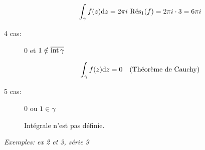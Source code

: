 \begin{example}[1]
\begin{description}
    \[ \int_\gamma f(z) \dz = 2\pi i \ \Res_{1}(f) = 2\pi i \cdot 3 = 6 \pi i \]
    
    \item[4\ieme{} cas:] 0 et $1 \notin \overline{\textrm{int}\, \gamma}$
    
    \[ \int_\gamma f(z) \mathrm{d}z = 0 \quad \textrm{(Théorème de Cauchy)} \]
    
    \item[5\ieme{} cas:] 0 ou $1 \in \gamma$
    
    Intégrale n'est pas définie.
    \end{description}

    \textit{Exemples: ex 2 et 3, série 9}
\end{example}






















